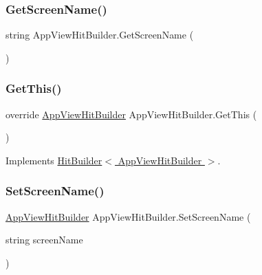 \subsubsection{\texorpdfstring{Get\+Screen\+Name()}{GetScreenName()}}
{\footnotesize\ttfamily string App\+View\+Hit\+Builder.\+Get\+Screen\+Name (\begin{DoxyParamCaption}{ }\end{DoxyParamCaption})}

\mbox{\label{class_app_view_hit_builder_a3480e5a885a822459f34498cdf62ca03}} 
\subsubsection{\texorpdfstring{Get\+This()}{GetThis()}}
{\footnotesize\ttfamily override \hyperlink{class_app_view_hit_builder}{App\+View\+Hit\+Builder} App\+View\+Hit\+Builder.\+Get\+This (\begin{DoxyParamCaption}{ }\end{DoxyParamCaption})\hspace{0.3cm}{\ttfamily [virtual]}}



Implements \hyperlink{class_hit_builder_a4276c57427406e264dc33f8c900ad530}{Hit\+Builder$<$ App\+View\+Hit\+Builder $>$}.

\mbox{\label{class_app_view_hit_builder_aefd5968bc04afb8fcf2512af80eaa409}} 
\subsubsection{\texorpdfstring{Set\+Screen\+Name()}{SetScreenName()}}
{\footnotesize\ttfamily \hyperlink{class_app_view_hit_builder}{App\+View\+Hit\+Builder} App\+View\+Hit\+Builder.\+Set\+Screen\+Name (\begin{DoxyParamCaption}\item[{string}]{screen\+Name }\end{DoxyParamCaption})}

\mbox{\label{class_app_view_hit_builder_a2336a0b7cb1a3179b86eb54ce6d0344f}} 
